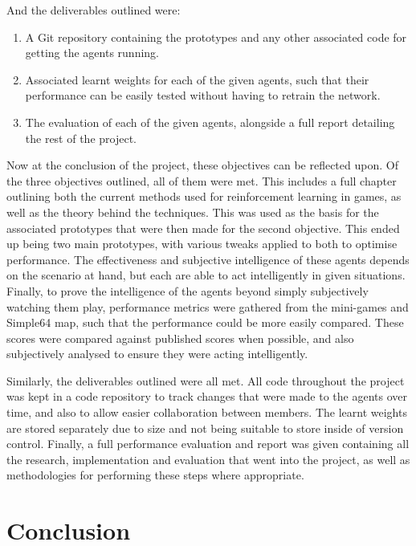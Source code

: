 And the deliverables outlined were:

\begin{enumerate}
    \item A Git repository containing the prototypes and any other associated
        code for getting the agents running.
    \item Associated learnt weights for each of the given agents, such that
        their performance can be easily tested without having to retrain
        the network.
    \item The evaluation of each of the given agents, alongside a full report
        detailing the rest of the project.
\end{enumerate}

Now at the conclusion of the project, these objectives can be reflected upon. Of
the three objectives outlined, all of them were met. This includes a full
chapter outlining both the current methods used for reinforcement learning in
games, as well as the theory behind the techniques. This was used as the basis
for the associated prototypes that were then made for the second objective. This
ended up being two main prototypes, with various tweaks applied to both to
optimise performance. The effectiveness and subjective intelligence of these
agents depends on the scenario at hand, but each are able to act intelligently
in given situations. Finally, to prove the intelligence of the agents beyond
simply subjectively watching them play, performance metrics were gathered from
the mini-games and Simple64 map, such that the performance could be more easily
compared. These scores were compared against published scores when possible, and
also subjectively analysed to ensure they were acting intelligently.

Similarly, the deliverables outlined were all met. All code throughout the
project was kept in a code repository to track changes that were made to the
agents over time, and also to allow easier collaboration between members. The
learnt weights are stored separately due to size and not being suitable to store
inside of version control. Finally, a full performance evaluation and report was
given containing all the research, implementation and evaluation that went into
the project, as well as methodologies for performing these steps where
appropriate.


\section{Conclusion}

